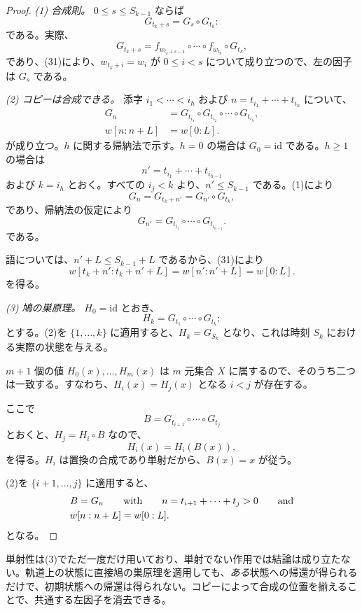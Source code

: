 \documentclass[11pt,reqno]{amsart}
\theoremstyle{definition}
\theoremstyle{definition}
\theoremstyle{remark}
\begin{document}
\begin{proof}\leavevmode\label{proof:49}
\emph{(1) 合成則。} \(0\le s\le S_{k-1}\) ならば
\[
G_{t_k+s}=G_s\circ G_{t_k}:
\]
である。実際、
\[
G_{t_k+s}=f_{w_{t_k+s-1}}\circ\cdots\circ f_{w_{t_k}}\circ G_{t_k},
\]
であり、(31)により、\(w_{t_k+i}=w_i\) が \(0\le i<s\) について成り立つので、左の因子は \(G_s\) である。

\emph{(2) コピーは合成できる。} 添字 \(i_1<\cdots<i_h\) および
\(n=t_{i_1}+\cdots+t_{i_h}\) について、
\[
\begin{aligned}
G_n&=G_{t_{i_1}}\circ G_{t_{i_2}}\circ\cdots\circ G_{t_{i_h}},\\
w[n:n+L]&=w[0:L].
\end{aligned}
\]
が成り立つ。\(h\) に関する帰納法で示す。\(h=0\) の場合は \(G_0=\mathrm{id}\) である。\(h\ge1\) の場合は
\[
n'=t_{i_1}+\cdots+t_{i_{h-1}}
\]
および \(k=i_h\) とおく。すべての
\(i_j<k\) より、\(n'\le S_{k-1}\) である。(1)により
\[
G_n=G_{t_k+n'}=G_{n'}\circ
G_{t_k},
\]
であり、帰納法の仮定により
\[
G_{n'}=G_{t_{i_1}}\circ\cdots\circ
G_{t_{i_{h-1}}}.
\]
である。

語については、\(n'+L\le S_{k-1}+L\) であるから、(31)により
\[
w[t_k+n':t_k+n'+L]=w[n':n'+L]=w[0:L].
\]
を得る。

\emph{(3) 鳩の巣原理。} \(H_0=\mathrm{id}\) とおき、
\[
H_k=G_{t_1}\circ\cdots\circ G_{t_k};
\]
とする。(2)を \(\{1,\ldots,k\}\) に適用すると、\(H_k=G_{S_k}\) となり、これは時刻 \(S_k\) における実際の状態を与える。

\(m+1\) 個の値 \(H_0(x),\ldots,H_m(x)\) は \(m\) 元集合 \(X\) に属するので、そのうち二つは一致する。すなわち、\(H_i(x)=H_j(x)\) となる \(i<j\) が存在する。

ここで
\[
B=G_{t_{i+1}}\circ\cdots\circ G_{t_j}
\]
とおくと、\(H_j=H_i\circ B\) なので、
\[
H_i(x)=H_i(B(x)),
\]
を得る。\(H_i\) は置換の合成であり単射だから、\(B(x)=x\) が従う。

(2)を \(\{i+1,\ldots,j\}\) に適用すると、
\[
\begin{aligned}
&B=G_n\qquad \text{with}\qquad n=t_{i+1}+\cdots+t_j>0\qquad \text{and}\\
&w[n:n+L]=w[0:L].
\end{aligned}\qedhere
\]
となる。
\end{proof}

単射性は(3)でただ一度だけ用いており、単射でない作用では結論は成り立たない。軌道上の状態に直接鳩の巣原理を適用しても、\emph{ある}状態への帰還が得られるだけで、初期状態への帰還は得られない。コピーによって合成の位置を揃えることで、共通する左因子を消去できる。
\end{document}
